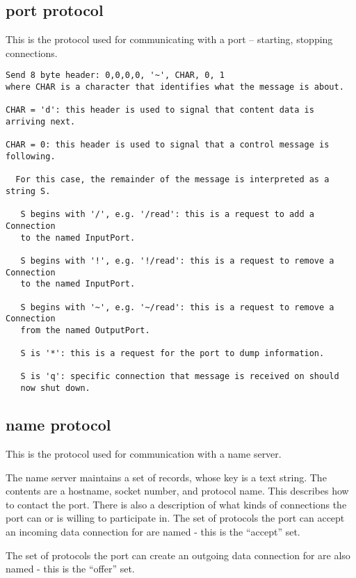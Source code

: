 \subsection{port protocol}

This is the protocol used for communicating with a port -- 
starting, stopping connections.

\begin{verbatim}
Send 8 byte header: 0,0,0,0, '~', CHAR, 0, 1
where CHAR is a character that identifies what the message is about.

CHAR = 'd': this header is used to signal that content data is arriving next.

CHAR = 0: this header is used to signal that a control message is following.

  For this case, the remainder of the message is interpreted as a string S.

   S begins with '/', e.g. '/read': this is a request to add a Connection 
   to the named InputPort.

   S begins with '!', e.g. '!/read': this is a request to remove a Connection 
   to the named InputPort.

   S begins with '~', e.g. '~/read': this is a request to remove a Connection 
   from the named OutputPort.

   S is '*': this is a request for the port to dump information.

   S is 'q': specific connection that message is received on should 
   now shut down.

\end{verbatim}



\subsection{name protocol}

This is the protocol used for communication with a name server.

The name server maintains a set of records, whose key is a text
string.  The contents are a hostname, socket number, and protocol
name.  This describes how to contact the port.  There is also
a description of what kinds of connections the port can or is
willing to participate in.  The set of protocols the port can
accept an incoming data connection for are named - this is the 
``accept'' set.

The set of protocols the port can create an outgoing data 
connection for are also named - this is the ``offer'' set.



